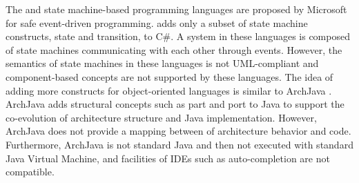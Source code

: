\noindent
{}
The  \cite{desai2013p} and  \cite{Deligiannis:2015:APA:2813885.2737996} state machine-based programming languages are proposed by Microsoft for safe event-driven programming.
 adds only a subset of state machine constructs, state and transition, to C\#. 
A system in these languages is composed of state machines communicating with each other through events.
However, the semantics of state machines in these languages is not UML-compliant and component-based concepts are not supported by these languages.
The idea of adding more constructs for object-oriented languages is similar to ArchJava \cite{aldrich2002archjava}. %
ArchJava \cite{aldrich2002archjava} adds structural concepts such as part and port to Java to support the co-evolution of architecture structure and Java implementation. 
However, ArchJava does not provide a mapping between of architecture behavior and code.
Furthermore, ArchJava is not standard Java and then not executed with standard Java Virtual Machine, and facilities of IDEs such as auto-completion are not compatible.%

